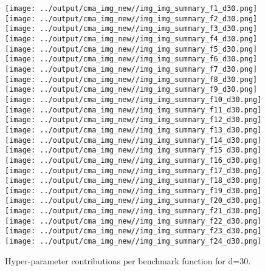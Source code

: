 \begin{figure}[t]
\centering
	\texttt{[image: ../output/cma\_img\_new//img\_img\_summary\_f1\_d30.png]}
	\texttt{[image: ../output/cma\_img\_new//img\_img\_summary\_f2\_d30.png]}
	\texttt{[image: ../output/cma\_img\_new//img\_img\_summary\_f3\_d30.png]}
	\texttt{[image: ../output/cma\_img\_new//img\_img\_summary\_f4\_d30.png]}
	\texttt{[image: ../output/cma\_img\_new//img\_img\_summary\_f5\_d30.png]}
	\texttt{[image: ../output/cma\_img\_new//img\_img\_summary\_f6\_d30.png]}
	\texttt{[image: ../output/cma\_img\_new//img\_img\_summary\_f7\_d30.png]}
	\texttt{[image: ../output/cma\_img\_new//img\_img\_summary\_f8\_d30.png]}
	\texttt{[image: ../output/cma\_img\_new//img\_img\_summary\_f9\_d30.png]}
	\texttt{[image: ../output/cma\_img\_new//img\_img\_summary\_f10\_d30.png]}
	\texttt{[image: ../output/cma\_img\_new//img\_img\_summary\_f11\_d30.png]}
	\texttt{[image: ../output/cma\_img\_new//img\_img\_summary\_f12\_d30.png]}
	\texttt{[image: ../output/cma\_img\_new//img\_img\_summary\_f13\_d30.png]}
	\texttt{[image: ../output/cma\_img\_new//img\_img\_summary\_f14\_d30.png]}
	\texttt{[image: ../output/cma\_img\_new//img\_img\_summary\_f15\_d30.png]}
	\texttt{[image: ../output/cma\_img\_new//img\_img\_summary\_f16\_d30.png]}
	\texttt{[image: ../output/cma\_img\_new//img\_img\_summary\_f17\_d30.png]}
	\texttt{[image: ../output/cma\_img\_new//img\_img\_summary\_f18\_d30.png]}
	\texttt{[image: ../output/cma\_img\_new//img\_img\_summary\_f19\_d30.png]}
	\texttt{[image: ../output/cma\_img\_new//img\_img\_summary\_f20\_d30.png]}
	\texttt{[image: ../output/cma\_img\_new//img\_img\_summary\_f21\_d30.png]}
	\texttt{[image: ../output/cma\_img\_new//img\_img\_summary\_f22\_d30.png]}
	\texttt{[image: ../output/cma\_img\_new//img\_img\_summary\_f23\_d30.png]}
	\texttt{[image: ../output/cma\_img\_new//img\_img\_summary\_f24\_d30.png]}
\caption{Hyper-parameter contributions per benchmark function for d=30. \label{fig:shapxplaind30}}

\end{figure}

